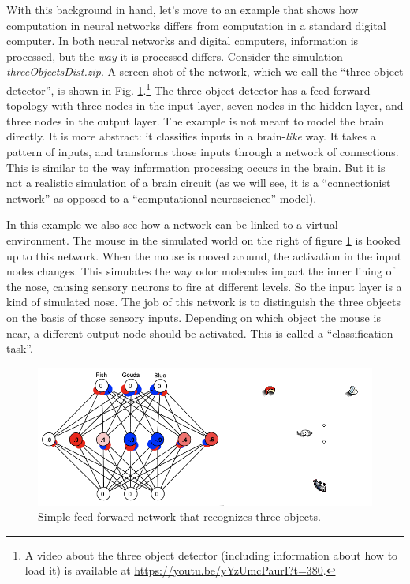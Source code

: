 With this background in hand, let's move to an example that shows how computation in neural networks differs from computation in a standard digital computer. In both neural networks and digital computers, information is processed, but the \emph{way} it is processed differs. Consider the simulation  {\em threeObjectsDist.zip}.  A screen shot of the network, which we call the ``three object detector'',  is shown in Fig. \ref{3ObjectClassifier}.\footnote{A video about the three object detector (including information about how to load it) is available at \url{https://youtu.be/yYzUmcPaurI?t=380}. } The three object detector has a feed-forward topology with three nodes in the input layer, seven nodes in the hidden layer, and three nodes in the output layer. The example is not meant to model the brain directly. It is more abstract:  it classifies inputs in a  brain-\emph{like} way. It takes a pattern of inputs, and transforms those inputs through a network of connections. This is similar to the way information processing occurs in the brain. But it is not a realistic simulation of a brain circuit (as we will see, it is a ``connectionist network'' as opposed to a ``computational neuroscience'' model).

In this example we also see how a network can be linked to a virtual environment. The mouse in the simulated world on the right of figure \ref{3ObjectClassifier} is hooked up to this network. When the mouse is moved around, the activation in the input nodes changes. This simulates the way odor molecules impact the inner lining of the nose, causing sensory neurons to fire at different levels. So the input layer is a kind of simulated nose. The job of this network is to distinguish the three objects on the basis of those sensory inputs. Depending on which object the mouse is near, a different output node should be activated. This is called a ``classification task''.

\begin{figure}[h]
\centering
\includegraphics[scale=.4]{./images/3Node_World.png}
\caption[Simbrain screenshot.]{Simple feed-forward network that recognizes three objects.}
\label{3ObjectClassifier}
\end{figure}

